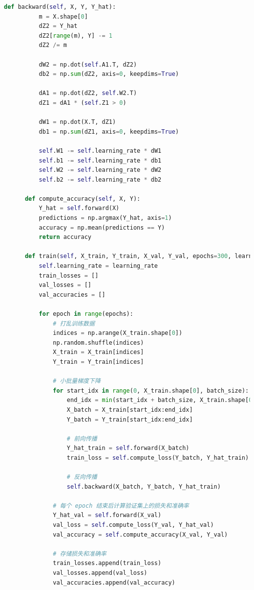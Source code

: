 \documentclass[12pt]{article}
\begin{document}
\begin{lstlisting}[language=Python]
      def backward(self, X, Y, Y_hat):
          m = X.shape[0]
          dZ2 = Y_hat
          dZ2[range(m), Y] -= 1
          dZ2 /= m
  
          dW2 = np.dot(self.A1.T, dZ2)
          db2 = np.sum(dZ2, axis=0, keepdims=True)
  
          dA1 = np.dot(dZ2, self.W2.T)
          dZ1 = dA1 * (self.Z1 > 0)
  
          dW1 = np.dot(X.T, dZ1)
          db1 = np.sum(dZ1, axis=0, keepdims=True)
  
          self.W1 -= self.learning_rate * dW1
          self.b1 -= self.learning_rate * db1
          self.W2 -= self.learning_rate * dW2
          self.b2 -= self.learning_rate * db2
  
      def compute_accuracy(self, X, Y):
          Y_hat = self.forward(X)
          predictions = np.argmax(Y_hat, axis=1)
          accuracy = np.mean(predictions == Y)
          return accuracy
  
      def train(self, X_train, Y_train, X_val, Y_val, epochs=300, learning_rate=0.01):
          self.learning_rate = learning_rate
          train_losses = []
          val_losses = []
          val_accuracies = []
  
          for epoch in range(epochs):
              # 打乱训练数据
              indices = np.arange(X_train.shape[0])
              np.random.shuffle(indices)
              X_train = X_train[indices]
              Y_train = Y_train[indices]
  
              # 小批量梯度下降
              for start_idx in range(0, X_train.shape[0], batch_size):
                  end_idx = min(start_idx + batch_size, X_train.shape[0])
                  X_batch = X_train[start_idx:end_idx]
                  Y_batch = Y_train[start_idx:end_idx]
  
                  # 前向传播
                  Y_hat_train = self.forward(X_batch)
                  train_loss = self.compute_loss(Y_batch, Y_hat_train)
                  
                  # 反向传播
                  self.backward(X_batch, Y_batch, Y_hat_train)
  
              # 每个 epoch 结束后计算验证集上的损失和准确率
              Y_hat_val = self.forward(X_val)
              val_loss = self.compute_loss(Y_val, Y_hat_val)
              val_accuracy = self.compute_accuracy(X_val, Y_val)
              
              # 存储损失和准确率
              train_losses.append(train_loss)
              val_losses.append(val_loss)
              val_accuracies.append(val_accuracy)
              

\end{lstlisting}
\end{document}
